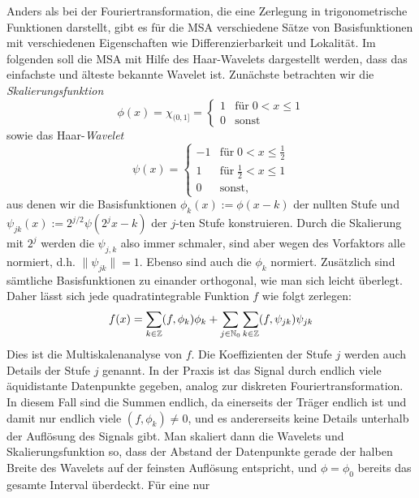 Anders als bei der Fouriertransformation, die eine Zerlegung in
trigonometrische Funktionen darstellt, gibt es für die MSA
verschiedene Sätze von Basisfunktionen mit verschiedenen Eigenschaften
wie Differenzierbarkeit und Lokalität. Im folgenden soll die MSA mit
Hilfe des Haar-Wavelets dargestellt werden, dass das einfachste und
älteste bekannte Wavelet ist. Zunächste betrachten wir die
\emph{Skalierungsfunktion}
\begin{equation}
  \phi(x) = \chi_{(0,1]} =
  \begin{cases}
    1 &\text{für}\; 0 < x \le 1\\
    0 &\text{sonst}
  \end{cases}
\end{equation}
sowie das Haar-\emph{Wavelet}
\begin{equation}
  \psi(x) =
  \begin{cases}
    -1 &\text{für}\; 0 < x \le \frac{1}{2}\\
    1 &\text{für}\; \frac{1}{2} < x \le 1 \\
    0 &\text{sonst},
  \end{cases}
\end{equation}
aus denen wir die Basisfunktionen $\phi_k(x) := \phi(x - k)$ der nullten
Stufe und $\psi_{jk}(x) := 2^{j/2}\psi(2^jx-k)$ der $j$-ten Stufe
konstruieren. Durch die Skalierung mit $2^j$ werden die $\psi_{j,k}$
also immer schmaler, sind aber wegen des Vorfaktors alle normiert,
d.h. $\lVert \psi_{jk} \rVert = 1$. Ebenso sind auch die $\phi_k$
normiert. Zusätzlich sind sämtliche Basisfunktionen zu einander
orthogonal, wie man sich leicht überlegt. Daher lässt sich jede
quadratintegrable Funktion $f$ wie folgt zerlegen:
\begin{equation}
  f(x) = \sum_{k\in\mathbb{Z}} (f,\phi_k)\phi_k + \sum_{j\in\mathbb{N}_0}
  \sum_{k\in\mathbb{Z}} (f,\psi_{jk})\psi_{jk}
\end{equation}
Dies ist die Multiskalenanalyse von $f$. Die Koeffizienten der Stufe
$j$ werden auch Details der Stufe $j$ genannt. In der Praxis ist das
Signal durch endlich viele äquidistante Datenpunkte gegeben, analog
zur diskreten Fouriertransformation. In diesem Fall sind die Summen
endlich, da einerseits der Träger endlich ist und damit nur endlich
viele $(f,\phi_k)\neq 0$, und es andererseits keine Details unterhalb
der Auflösung des Signals gibt. Man skaliert dann die Wavelets und
Skalierungsfunktion so, dass der Abstand der Datenpunkte gerade der
halben Breite des Wavelets auf der feinsten Auflösung entspricht, und
$\phi = \phi_0$ bereits das gesamte Interval überdeckt. Für eine nur
